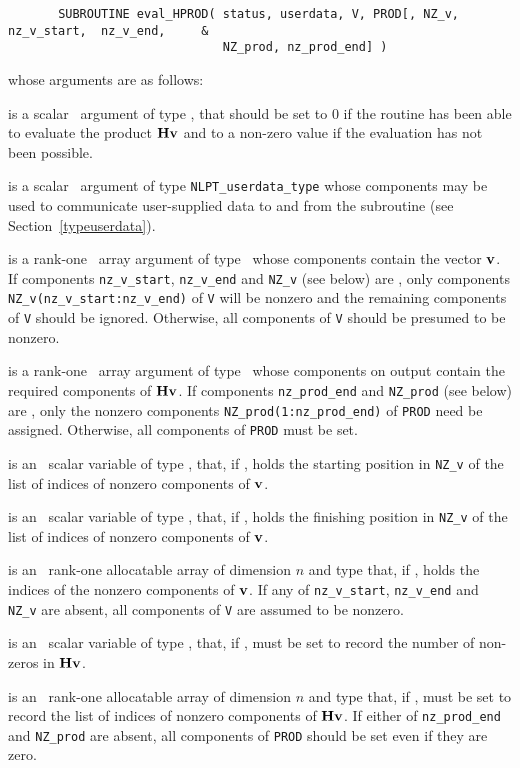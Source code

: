 \documentclass{galahad}
\begin{document}
\def\baselinestretch{0.8}
{\tt \begin{verbatim}
       SUBROUTINE eval_HPROD( status, userdata, V, PROD[, NZ_v, nz_v_start,  nz_v_end,     &
                              NZ_prod, nz_prod_end] )
\end{verbatim} }
\def\baselinestretch{1.0}
\noindent whose arguments are as follows:

\begin{description}
 is a scalar \intentout\ argument of type \integer,
that should be set to 0 if the routine has been able to evaluate the
product ${\mathbf{H}} {\mathbf{v}}$ 
and to a non-zero value if the evaluation has not been possible.

 is a scalar \intentinout\ argument of type 
{\tt NLPT\_userdata\_type} whose components may be used
to communicate user-supplied data to and from the
subroutine (see Section~\ref{typeuserdata}). 

 is a rank-one \intentin\ array argument of type \realdp\
whose components contain the vector ${\mathbf{v}}$. 
If components
{\tt nz\_v\_start},
{\tt nz\_v\_end} 
and
{\tt NZ\_v} 
(see below) are \present,
only components {\tt NZ\_v(nz\_v\_start:nz\_v\_end)} of {\tt V} 
will be nonzero and the remaining components of {\tt V} should be
ignored. Otherwise, all components of {\tt V} should be presumed to be nonzero.

 is a rank-one \intentout\ array argument of type \realdp\
whose components on output contain the required components of ${\mathbf{H}} {\mathbf{v}}$.
If components
{\tt nz\_prod\_end} 
and
{\tt NZ\_prod} 
(see below) are \present, 
only the nonzero components {\tt NZ\_prod(1:nz\_prod\_end)} of {\tt PROD} 
need be assigned.
Otherwise, all components of {\tt PROD} must be set.

 is an \optional\ scalar variable of type \integer, 
that, if \present, holds the starting position in {\tt NZ\_v}
of the list of indices of nonzero components of ${\mathbf{v}}$.

 is an \optional\ scalar variable of type \integer, 
that, if \present, holds the finishing position in {\tt NZ\_v}
of the list of indices of nonzero components of ${\mathbf{v}}$.

 is an \optional\  rank-one allocatable array of dimension $n$
and type \integer that, if \present, holds the indices of the
nonzero components of ${\mathbf{v}}$. If any of 
{\tt nz\_v\_start},
{\tt nz\_v\_end} 
and
{\tt NZ\_v} 
are absent, all components of {\tt V} are assumed to be nonzero.

\itt{nz\_prod\_end} is an \optional\ scalar variable of type \integer,
that, if \present, must be set to record the number of non-zeros in 
${\mathbf{H}} {\mathbf{v}}$.

 is an \optional\ rank-one allocatable array of dimension $n$
and type \integer that, if \present, must be set to record the list of
indices of nonzero components of ${\mathbf{H}} {\mathbf{v}}$. 
If either of 
{\tt nz\_prod\_end} 
and
{\tt NZ\_prod} 
are absent, all components of {\tt PROD} should be set even if they are zero.


\end{description}
\end{document}
